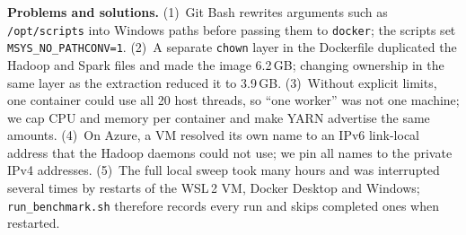 \textbf{Problems and solutions.} (1)~Git Bash rewrites arguments such as
\texttt{/opt/scripts} into Windows paths before passing them to \texttt{docker}; the
scripts set \texttt{MSYS\_NO\_PATHCONV=1}. (2)~A separate \texttt{chown} layer in the
Dockerfile duplicated the Hadoop and Spark files and made the image 6.2\,GB; changing
ownership in the same layer as the extraction reduced it to 3.9\,GB. (3)~Without
explicit limits, one container could use all 20 host threads, so ``one worker'' was
not one machine; we cap CPU and memory per container and make YARN advertise the same
amounts. (4)~On Azure, a VM resolved its own name to an IPv6 link-local address that
the Hadoop daemons could not use; we pin all names to the private IPv4 addresses.
(5)~The full local sweep took many hours and was interrupted several times by restarts
of the WSL\,2 VM, Docker Desktop and Windows; \texttt{run\_benchmark.sh} therefore records every run and
skips completed ones when restarted.

